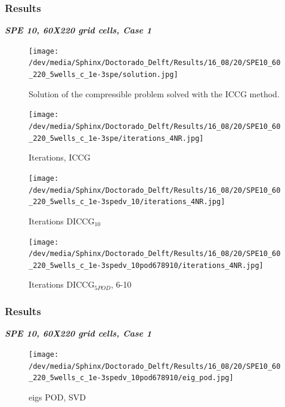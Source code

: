 \documentclass{beamer}
\begin{document}
\begin{frame}[shrink=5]
\frametitle{Results}
\emph{\Large \textbf{SPE 10, 60X220 grid cells, Case 1}}
\begin{figure}[!h]
\centering 
\begin{minipage}{.45\textwidth}
 \centering
\texttt{[image: /dev/media/Sphinx/Doctorado\_Delft/Results/16\_08/20/SPE10\_60\_220\_5wells\_c\_1e-3spe/solution.jpg]}
\caption{Solution of the compressible problem solved with the ICCG method.}
\label{fig:compsol}
\end{minipage}%
\hspace{10mm}
\begin{minipage}{.45\textwidth}
 \centering
\texttt{[image: /dev/media/Sphinx/Doctorado\_Delft/Results/16\_08/20/SPE10\_60\_220\_5wells\_c\_1e-3spe/iterations\_4NR.jpg]}
\caption{Iterations, ICCG}
\label{fig:NR_IC}
\end{minipage}
\end{figure}
\begin{figure}[!h]
\centering
\begin{minipage}{.4\textwidth}
 \centering
\texttt{[image: /dev/media/Sphinx/Doctorado\_Delft/Results/16\_08/20/SPE10\_60\_220\_5wells\_c\_1e-3spedv\_10/iterations\_4NR.jpg]}
\caption{Iterations DICCG$_{10}$}
\label{fig:NR_D10}
\end{minipage}%
\hspace{15mm}
\begin{minipage}{.4\textwidth}
 \centering
\texttt{[image: /dev/media/Sphinx/Doctorado\_Delft/Results/16\_08/20/SPE10\_60\_220\_5wells\_c\_1e-3spedv\_10pod678910/iterations\_4NR.jpg]}
\caption{Iterations DICCG$_{5POD}$, 6-10}
\label{fig:NR_POD5}
\end{minipage}
\end{figure}
\end{frame}
\begin{frame}[shrink=10]
\frametitle{Results}

\emph{\textbf{SPE 10, 60X220 grid cells, Case 1}}\\
\begin{figure}
\centering
\begin{minipage}{.45\textwidth}
 \centering
\texttt{[image: /dev/media/Sphinx/Doctorado\_Delft/Results/16\_08/20/SPE10\_60\_220\_5wells\_c\_1e-3spedv\_10pod678910/eig\_pod.jpg]}
\caption{eigs POD, SVD}
\label{fig:NR_IC}
\end{minipage}
\end{figure}
\end{frame}
\end{document}
